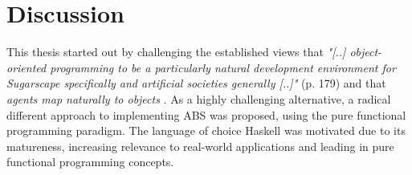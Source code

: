 \chapter{Discussion}
\label{ch:discussion}
This thesis started out by challenging the established views that \textit{"[..] object-oriented programming to be a particularly natural development environment for Sugarscape specifically and artificial societies generally [..]"} \cite{epstein_growing_1996} (p. 179) and that \textit{agents map naturally to objects} \cite{north_managing_2007}. As a highly challenging alternative, a radical different approach to implementing ABS was proposed, using the pure functional programming paradigm. The language of choice Haskell was motivated due to its matureness, increasing relevance to real-world applications and leading in pure functional programming concepts. 

